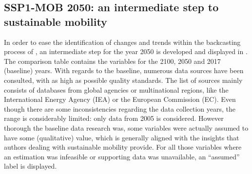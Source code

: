 \subsection{SSP1-MOB 2050: an intermediate step to sustainable mobility}
\label{ss:results:backcasting-2050-intermediate-step}
In order to ease the identification of changes and trends within the backcasting process of , an intermediate step for the year 2050 is developed and displayed in . The comparison table contains the variables for the 2100, 2050 and 2017 (baseline) years. With regards to the baseline, numerous data sources have been consulted, with as high as possible quality standards. The list of sources mainly consists of databases from global agencies or multinational regions, like the International Energy Agency (IEA) or the European Commission (EC). Even though there are some inconsistencies regarding the data collection years, the range is considerably limited: only data from 2005 is considered. However thorough the baseline data research was, some variables were actually assumed to have some (qualitative) value, which is generally aligned with the insights that authors dealing with sustainable mobility provide. For all those variables where an estimation was infeasible or supporting data was unavailable, an ``assumed'' label is displayed.
